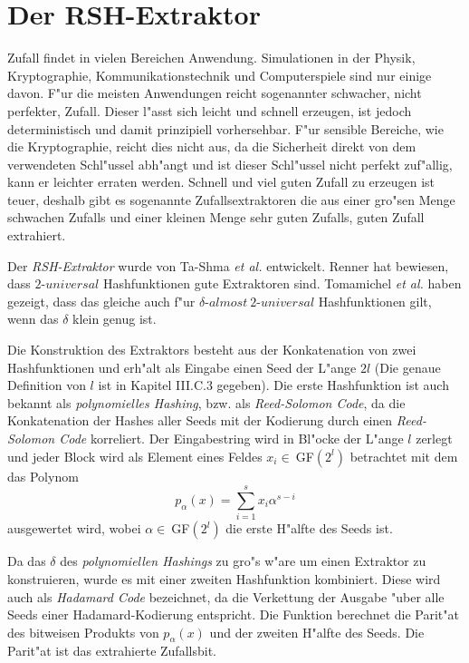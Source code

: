 \section{Der RSH-Extraktor}

Zufall findet in vielen Bereichen Anwendung. Simulationen in der Physik, Kryptographie, Kommunikationstechnik und Computerspiele sind nur einige davon. F"ur die meisten Anwendungen reicht sogenannter schwacher, nicht perfekter, Zufall. Dieser l"asst sich leicht und schnell erzeugen, ist jedoch deterministisch und damit prinzipiell vorhersehbar. F"ur sensible Bereiche, wie die Kryptographie, reicht dies nicht aus, da die Sicherheit direkt von dem verwendeten Schl"ussel abh"angt und ist dieser Schl"ussel nicht perfekt zuf"allig, kann er leichter erraten werden. Schnell und viel guten Zufall zu erzeugen ist teuer, deshalb gibt es sogenannte Zufallsextraktoren die aus einer gro"sen Menge schwachen Zufalls und einer kleinen Menge sehr guten Zufalls, guten Zufall extrahiert.

Der \emph{RSH-Extraktor} wurde von Ta-Shma \emph{et al.} \cite{ta2004extractor} entwickelt. Renner \cite{renner2008security} hat bewiesen, dass $2$-$universal$ Hashfunktionen gute Extraktoren sind. Tomamichel \emph{et al.} \cite{tomamichel2011leftover} haben gezeigt, dass das gleiche auch f"ur $\delta$-$almost\ 2$-$universal$ Hashfunktionen gilt, wenn das $\delta$ klein genug ist.

Die Konstruktion des Extraktors besteht aus der Konkatenation von zwei Hashfunktionen und erh"alt als Eingabe einen Seed der L"ange $2l$ (Die genaue Definition von $l$ ist in \cite{mauerer2012modular} Kapitel III.C.3 gegeben). Die erste Hashfunktion ist auch bekannt als \emph{polynomielles Hashing}, bzw. als \emph{Reed-Solomon Code}, da die Konkatenation der Hashes aller Seeds mit der Kodierung durch einen \emph{Reed-Solomon Code} korreliert. Der Eingabestring wird in Bl"ocke der L"ange $l$ zerlegt und jeder Block wird als Element eines Feldes $x_i \in\ $GF$(2^l)$ betrachtet mit dem das Polynom
\begin{equation}
	p_\alpha(x) = \sum_{i=1}^{s} x_i \alpha ^{s-i}
\end{equation}
ausgewertet wird, wobei $\alpha \in\ $GF$(2^l)$ die erste H"alfte des Seeds ist.

Da das $\delta$ des \emph{polynomiellen Hashings} zu gro"s w"are um einen Extraktor zu konstruieren, wurde es mit einer zweiten Hashfunktion kombiniert. Diese wird auch als \emph{Hadamard Code} bezeichnet, da die Verkettung der Ausgabe "uber alle Seeds einer Hadamard-Kodierung entspricht. Die Funktion berechnet die Parit"at des bitweisen Produkts von $p_\alpha(x)$ und der zweiten H"alfte des Seeds. Die Parit"at ist das extrahierte Zufallsbit.

